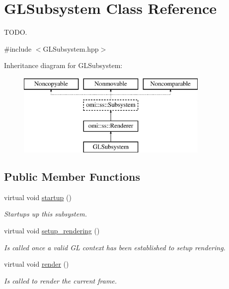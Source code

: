 \hypertarget{class_g_l_subsystem}{}\section{G\+L\+Subsystem Class Reference}
\label{class_g_l_subsystem}


T\+O\+DO.  




{\ttfamily \#include $<$G\+L\+Subsystem.\+hpp$>$}

Inheritance diagram for G\+L\+Subsystem\+:\begin{figure}[H]
\begin{center}
\leavevmode
\includegraphics[height=4.000000cm]{class_g_l_subsystem}
\end{center}
\end{figure}
\subsection*{Public Member Functions}
\begin{DoxyCompactItemize}
\item 
virtual void \hyperlink{class_g_l_subsystem_a05c8c799107f035e4effe8b55edbe16d}{startup} ()
\begin{DoxyCompactList}\small\item\em Startups up this subsystem. \end{DoxyCompactList}\item 
virtual void \hyperlink{class_g_l_subsystem_ab158d7f38b073a986714a02c10606abc}{setup\+\_\+rendering} ()\hypertarget{class_g_l_subsystem_ab158d7f38b073a986714a02c10606abc}{}\label{class_g_l_subsystem_ab158d7f38b073a986714a02c10606abc}

\begin{DoxyCompactList}\small\item\em Is called once a valid GL context has been established to setup rendering. \end{DoxyCompactList}\item 
virtual void \hyperlink{class_g_l_subsystem_a542f9685fe4b2924aec576fd836e51e1}{render} ()\hypertarget{class_g_l_subsystem_a542f9685fe4b2924aec576fd836e51e1}{}\label{class_g_l_subsystem_a542f9685fe4b2924aec576fd836e51e1}

\begin{DoxyCompactList}\small\item\em Is called to render the current frame. \end{DoxyCompactList}\end{DoxyCompactItemize}
